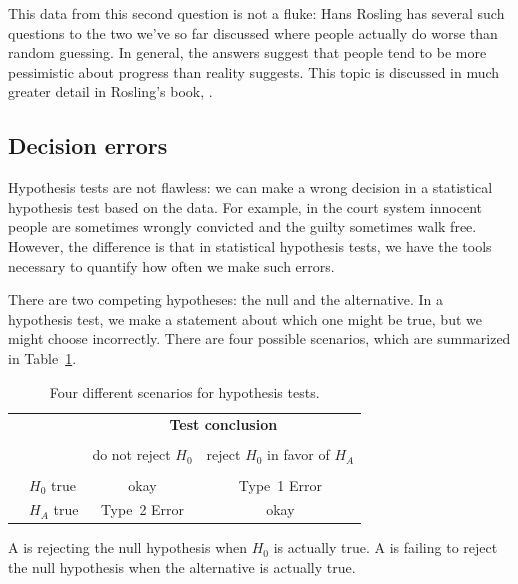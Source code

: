 This data from this second question is not a fluke:
Hans Rosling has several such questions
to the two we've so far discussed where people
actually do worse than random guessing.
In general, the answers suggest that people tend to be
more pessimistic about progress than reality suggests.
This topic is discussed in much greater detail in
Rosling's book,
\emph{}.



\subsection{Decision errors}


Hypothesis tests are not flawless: we can make a wrong
decision in a statistical hypothesis test based on the data.
For example, in the court system innocent people are
sometimes wrongly convicted and the guilty sometimes walk free.
However, the difference is that in statistical hypothesis tests,
we have the tools necessary to quantify how often we make
such errors.

There are two competing hypotheses: the null and the alternative.
In a hypothesis test, we make a statement about which one might
be true, but we might choose incorrectly. There are four possible
scenarios, which are summarized in Table~\ref{fourHTScenarios}.

\begin{table}[ht]
\centering
\begin{tabular}{l l c c}
& & \multicolumn{2}{c}{\textbf{Test conclusion}} \\
  \cline{3-4}
\vspace{-3.7mm} \\
& & do not reject $H_0$ &  reject $H_0$ in favor of $H_A$ \\
  \cline{2-4}
\vspace{-3.7mm} \\
& $H_0$ true & okay &  Type~1 Error \\
\raisebox{1.5ex}{\textbf{Truth}} & $H_A$ true & Type~2 Error & okay \\
  \cline{2-4}
\end{tabular}
\caption{Four different scenarios for hypothesis tests.}
\label{fourHTScenarios}
\end{table}

A  is rejecting the null hypothesis when
$H_0$ is actually true. A  is failing to
reject the null hypothesis when the alternative is actually
true.

